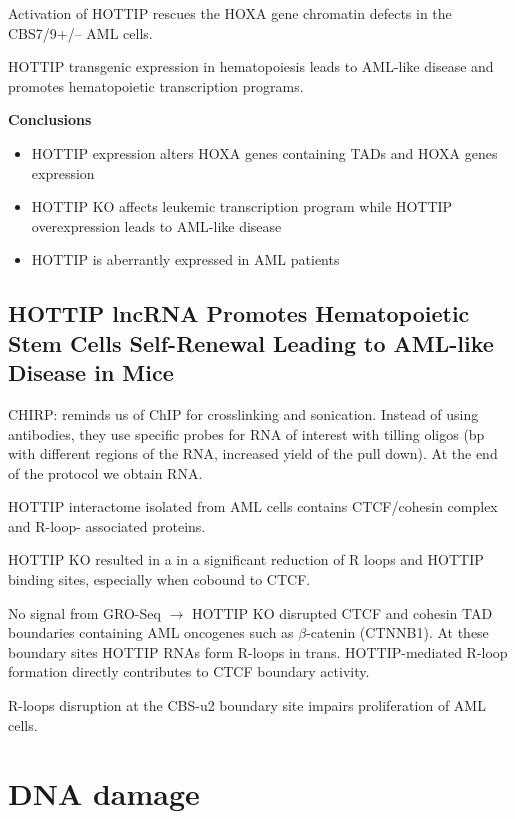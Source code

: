 Activation of HOTTIP rescues the HOXA gene chromatin defects in the CBS7/9+/-- AML cells.

HOTTIP transgenic expression in hematopoiesis leads to AML-like disease and promotes hematopoietic transcription programs.

\textbf{Conclusions}

\begin{itemize}
\tightlist
\item
  HOTTIP expression alters HOXA genes containing TADs and HOXA genes expression
\item
  HOTTIP KO affects leukemic transcription program while HOTTIP overexpression leads to AML-like disease
\item
  HOTTIP is aberrantly expressed in AML patients
\end{itemize}

\hypertarget{hottip-lncrna-promotes-hematopoietic-stem-cells-self-renewal-leading-to-aml-like-disease-in-mice}{%
\subsection{HOTTIP lncRNA Promotes Hematopoietic Stem Cells Self-Renewal Leading to AML-like Disease in Mice}\label{hottip-lncrna-promotes-hematopoietic-stem-cells-self-renewal-leading-to-aml-like-disease-in-mice}}

CHIRP: reminds us of ChIP for crosslinking and sonication. Instead of using antibodies, they use specific probes for RNA of interest with tilling oligos (bp with different regions of the RNA, increased yield of the pull down). At the end of the protocol we obtain RNA.

HOTTIP interactome isolated from AML cells contains CTCF/cohesin complex and R-loop- associated proteins.

HOTTIP KO resulted in a in a significant reduction of R loops and HOTTIP binding sites, especially when cobound to CTCF.

No signal from GRO-Seq $\rightarrow$ HOTTIP KO disrupted CTCF and cohesin TAD boundaries containing AML oncogenes such as $\beta$-catenin (CTNNB1). At these boundary sites HOTTIP RNAs form R-loops in trans. HOTTIP-mediated R-loop formation directly contributes to CTCF boundary activity.

R-loops disruption at the CBS-u2 boundary site impairs proliferation of AML cells.


\hypertarget{dna-damage}{%
\section{DNA damage}\label{dna-damage}}

